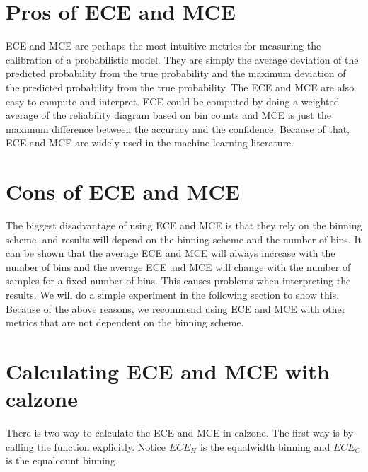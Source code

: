 \documentclass[letterpaper,10pt,english]{sphinxmanual}
\begin{document}
\section{Pros of ECE and MCE}
\label{\detokenize{notebooks/ece_mce:Pros-of-ECE-and-MCE}}
\sphinxAtStartPar
ECE and MCE are perhaps the most intuitive metrics for measuring the calibration of a probabilistic model. They are simply the average deviation of the predicted probability from the true probability and the maximum deviation of the predicted probability from the true probability. The ECE and MCE are also easy to compute and interpret. ECE could be computed by doing a weighted average of the reliability diagram based on bin counts and MCE is just the maximum difference between the accuracy and
the confidence. Because of that, ECE and MCE are widely used in the machine learning literature.


\section{Cons of ECE and MCE}
\label{\detokenize{notebooks/ece_mce:Cons-of-ECE-and-MCE}}
\sphinxAtStartPar
The biggest disadvantage of using ECE and MCE is that they rely on the binning scheme, and results will depend on the binning scheme and the number of bins. It can be shown that the average ECE and MCE will always increase with the number of bins and the average ECE and MCE will change with the number of samples for a fixed number of bins. This causes problems when interpreting the results. We will do a simple experiment in the following section to show this. Because of the above reasons, we
recommend using ECE and MCE with other metrics that are not dependent on the binning scheme.


\section{Calculating ECE and MCE with calzone}
\label{\detokenize{notebooks/ece_mce:Calculating-ECE-and-MCE-with-calzone}}
\sphinxAtStartPar
There is two way to calculate the ECE and MCE in calzone. The first way is by calling the function explicitly. Notice \(ECE_H\) is the equal\sphinxhyphen{}width binning and \(ECE_C\) is the equal\sphinxhyphen{}count binning.
\end{document}
